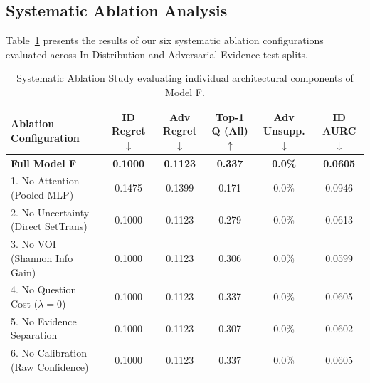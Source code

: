 \subsection{Systematic Ablation Analysis}
Table~\ref{tab:ablation_results} presents the results of our six systematic ablation configurations evaluated across In-Distribution and Adversarial Evidence test splits.

\begin{table}[h]
\centering
\small
\caption{Systematic Ablation Study evaluating individual architectural components of Model F.}
\label{tab:ablation_results}
\begin{tabular}{lccccc}
\toprule
\textbf{Ablation Configuration} & \textbf{ID Regret} $\downarrow$ & \textbf{Adv Regret} $\downarrow$ & \textbf{Top-1 Q (All)} $\uparrow$ & \textbf{Adv Unsupp.} $\downarrow$ & \textbf{ID AURC} $\downarrow$ \\
\midrule
\textbf{Full Model F} & \textbf{0.1000} & \textbf{0.1123} & \textbf{0.337} & \textbf{0.0\%} & \textbf{0.0605} \\
1. No Attention (Pooled MLP) & 0.1475 & 0.1399 & 0.171 & 0.0\% & 0.0946 \\
2. No Uncertainty (Direct SetTrans) & 0.1000 & 0.1123 & 0.279 & 0.0\% & 0.0613 \\
3. No VOI (Shannon Info Gain) & 0.1000 & 0.1123 & 0.306 & 0.0\% & 0.0599 \\
4. No Question Cost ($\lambda=0$) & 0.1000 & 0.1123 & 0.337 & 0.0\% & 0.0605 \\
5. No Evidence Separation & 0.1000 & 0.1123 & 0.307 & 0.0\% & 0.0602 \\
6. No Calibration (Raw Confidence) & 0.1000 & 0.1123 & 0.337 & 0.0\% & 0.0605 \\
\bottomrule
\end{tabular}
\end{table}


